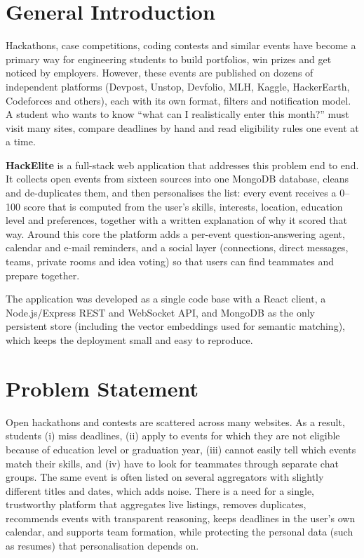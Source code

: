 \documentclass[12pt,a4paper]{report}
\begin{document}
\section{General Introduction}
Hackathons, case competitions, coding contests and similar events have become a primary way for engineering students to build portfolios, win prizes and get noticed by employers. However, these events are published on dozens of independent platforms (Devpost, Unstop, Devfolio, MLH, Kaggle, HackerEarth, Codeforces and others), each with its own format, filters and notification model. A student who wants to know ``what can I realistically enter this month?'' must visit many sites, compare deadlines by hand and read eligibility rules one event at a time.

\textbf{HackElite} is a full-stack web application that addresses this problem end to end. It collects open events from sixteen sources into one MongoDB database, cleans and de-duplicates them, and then personalises the list: every event receives a 0--100 score that is computed from the user's skills, interests, location, education level and preferences, together with a written explanation of why it scored that way. Around this core the platform adds a per-event question-answering agent, calendar and e-mail reminders, and a social layer (connections, direct messages, teams, private rooms and idea voting) so that users can find teammates and prepare together.

The application was developed as a single code base with a React client, a Node.js/Express REST and WebSocket API, and MongoDB as the only persistent store (including the vector embeddings used for semantic matching), which keeps the deployment small and easy to reproduce.

\section{Problem Statement}
Open hackathons and contests are scattered across many websites. As a result, students (i) miss deadlines, (ii) apply to events for which they are not eligible because of education level or graduation year, (iii) cannot easily tell which events match their skills, and (iv) have to look for teammates through separate chat groups. The same event is often listed on several aggregators with slightly different titles and dates, which adds noise. There is a need for a single, trustworthy platform that aggregates live listings, removes duplicates, recommends events with transparent reasoning, keeps deadlines in the user's own calendar, and supports team formation, while protecting the personal data (such as resumes) that personalisation depends on.
\end{document}
